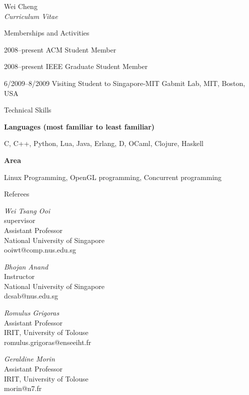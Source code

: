 \documentclass[10pt]{article}
\newenvironment{sublist}{%
	\begin{list}{}{%
		\setlength{\itemsep}{0em}\setlength{\parsep}{0em}%
		\setlength{\topsep}{0em}\setlength{\parskip}{0em}%
	}%
}%
{ \end{list} }
\begin{document}
\begin{cv}{Wei Cheng\\{\large \itshape Curriculum Vitae}}
\setlength{\oldcvlabelwidth}{\cvlabelwidth}
\setlength{\cvlabelwidth}{1em}


\begin{cvlist}{Memberships and Activities}
	\item[2008--present] ACM Student Member
    \item[2008--present] IEEE Graduate Student Member
    \item[6/2009--8/2009] Visiting Student to Singapore-MIT Gabmit Lab, MIT, Boston, USA
\end{cvlist}

\pagebreak

\setlength{\oldcvlabelwidth}{\cvlabelwidth}
\setlength{\cvlabelwidth}{1em}
\begin{cvlist}{Technical Skills}
	\item \textbf{Languages (most familiar to least familiar)}
	\begin{sublist}
    \item C, C++, Python, Lua, Java, Erlang, D, OCaml, Clojure, Haskell
	\end{sublist}
	\item \textbf{Area} 
	\begin{sublist}
		\item Linux Programming, OpenGL programming, Concurrent programming
        \end{sublist}
\end{cvlist}
\setlength{\cvlabelwidth}{\oldcvlabelwidth}

\begin{cvlist}{Referees}
    \item \emph{Wei Tsang Ooi}\\
    supervisor\\
    Assistant Professor\\
    National University of Singapore\\
    ooiwt@comp.nus.edu.sg
    \item \emph{Bhojan Anand}\\
    Instructor\\
    National University of Singapore\\
    dcsab@nus.edu.sg
    \item \emph{Romulus Grigoras}\\
    Assistant Professor\\
    IRIT, University of Tolouse\\
    romulus.grigoras@enseeiht.fr
    \item \emph{Geraldine Morin}\\
    Assistant Professor\\
    IRIT, University of Tolouse\\
    morin@n7.fr
\end{cvlist}


\end{cv}
\end{document}
